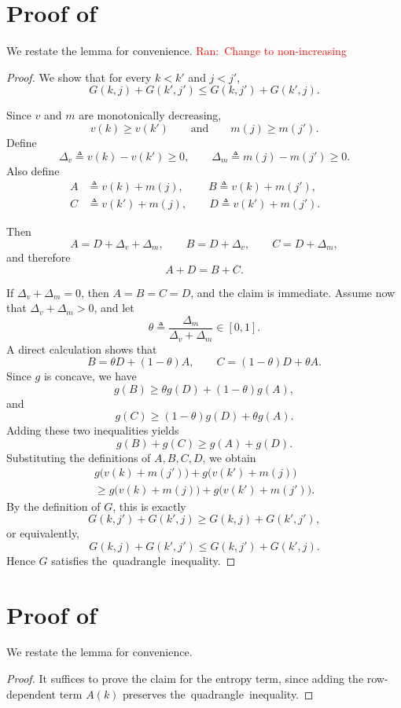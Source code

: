 \documentclass[11pt,letterpaper]{article}
\newcommand{\ran}[1]{\textcolor{red}{Ran:~#1}}
\newcommand{\ran}[1]{}
\begin{document}
{\appendix
\section{Proof of~}\label{app:quadrangle}
We restate the lemma for convenience. \ran{Change to non-increasing}
\quadrangleg*
    \begin{proof}
We show that for every $k<k'$ and $j<j'$,
\[
G(k,j)+G(k',j') \le G(k,j')+G(k',j).
\]

Since $v$ and $m$ are monotonically decreasing,
\[
v(k)\ge v(k')
\qquad\text{and}\qquad
m(j)\ge m(j').
\]
Define
\[
\Delta_v \triangleq v(k)-v(k') \ge 0,
\qquad
\Delta_m \triangleq m(j)-m(j') \ge 0.
\]
Also define
\begin{align*}
    A &\triangleq v(k)+m(j),\qquad\ 
B \triangleq v(k)+m(j'),\qquad\\
C &\triangleq v(k')+m(j),\qquad
D \triangleq v(k')+m(j').
\end{align*}

Then
\[
A=D+\Delta_v+\Delta_m,\qquad
B=D+\Delta_v,\qquad
C=D+\Delta_m,
\]
and therefore
\[
A+D=B+C.
\]

If $\Delta_v+\Delta_m=0$, then $A=B=C=D$, and the claim is immediate.  
Assume now that $\Delta_v+\Delta_m>0$, and let
\[
\theta \triangleq \frac{\Delta_m}{\Delta_v+\Delta_m}\in[0,1].
\]
A direct calculation shows that
\[
B=\theta D+(1-\theta)A,
\qquad
C=(1-\theta)D+\theta A.
\]
Since $g$ is concave, we have
\[
g(B)\ge \theta g(D)+(1-\theta)g(A),
\]
and
\[
g(C)\ge (1-\theta)g(D)+\theta g(A).
\]
Adding these two inequalities yields
\[
g(B)+g(C)\ge g(A)+g(D).
\]
Substituting the definitions of $A,B,C,D$, we obtain
\begin{multline*}
g\bigl(v(k)+m(j')\bigr)+g\bigl(v(k')+m(j)\bigr)\\
\ge
g\bigl(v(k)+m(j)\bigr)+g\bigl(v(k')+m(j')\bigr).
\end{multline*}
By the definition of $G$, this is exactly
\[
G(k,j')+G(k',j)\ge G(k,j)+G(k',j'),
\]
or equivalently,
\[
G(k,j)+G(k',j') \le G(k,j')+G(k',j).
\]
Hence $G$ satisfies \mbox{the quadrangle inequality.}
\end{proof}

\section{Proof of~}\label{app:quadrangleM}
We restate the lemma for convenience. 
\quadrangleM*
\begin{proof}
It suffices to prove the claim for the entropy term, since adding the
row-dependent term $A(k)$ preserves \mbox{the quadrangle inequality.}


\end{proof}}
\end{document}
